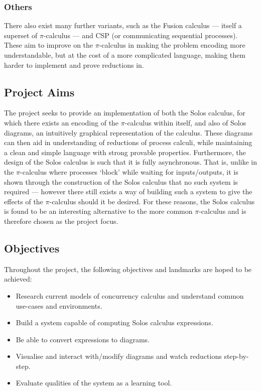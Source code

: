 \documentclass{article}
\begin{document}
\subsubsection{Others}
There also exist many further variants, such as the Fusion calculus --- itself a superset of $\pi$-calculus --- and CSP (or communicating sequential processes). These aim to improve on the $\pi$-calculus in making the problem encoding more understandable, but at the cost of a more complicated language, making them harder to implement and prove reductions in.


\subsection{Project Aims}
The project seeks to provide an implementation of both the Solos calculus, for which there exists an encoding of the $\pi$-calculus within itself, and also of Solos diagrams, an intuitively graphical representation of the calculus. These diagrams can then aid in understanding of reductions of process calculi, while maintaining a clean and simple language with strong provable properties.
Furthermore, the design of the Solos calculus is such that it is fully asynchronous. That is, unlike in the $\pi$-calculus where processes `block' while waiting for inputs/outputs, it is shown through the construction of the Solos calculus that no such system is required --- however there still exists a way of building such a system to give the effects of the $\pi$-calculus should it be desired.
For these reasons, the Solos calculus is found to be an interesting alternative to the more common $\pi$-calculus and is therefore chosen as the project focus.

\subsection{Objectives}
Throughout the project, the following objectives and landmarks are hoped to be achieved:
\begin{itemize}
	\item Research current models of concurrency calculus and understand common use-cases and environments.
	\item Build a system capable of computing Solos calculus expressions.
	\item Be able to convert expressions to diagrams.
	\item Visualise and interact with/modify diagrams and watch reductions step-by-step.
	\item Evaluate qualities of the system as a learning tool.
\end{itemize}
\end{document}
